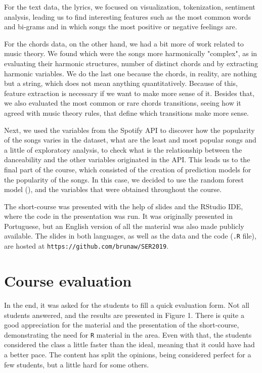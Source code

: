 For the text data, the lyrics, we focused on visualization,
tokenization, sentiment analysis, leading us to find interesting
features such as the most common words and bi-grams and in which songs the most positive or negative feelings are.  

For the chords data, on the other hand, we had a bit
more of work related to music theory. We found which
were the songs more harmonically "complex", as in evaluating
their harmonic structures, number of distinct chords and
by extracting harmonic variables. We do the last one 
because the chords, in reality, are nothing but a string, 
which does not mean anything quantitatively. Because of 
this, feature extraction is necessary if we want to make
more sense of it. Besides that, we also evaluated the
most common or rare chords transitions, seeing how it agreed
with music theory rules, that define which transitions 
make more sense. 

Next, we used the variables from the Spotify API 
to discover how the popularity of the songs varies in the
dataset, what are the least and most popular songs and
a little of exploratory analysis, to check what is the relationship between the danceability and the other variables originated in the API. This leads us to the final
part of the course, which consisted of the creation
of prediction models for the popularity of the songs. In 
this case, we decided to use the random forest model
(\cite{Breiman2001}), 
and the variables that were obtained throughout the course. 


The short-course was presented with the help of slides 
and the RStudio IDE, where the code in the presentation
was run. It was originally presented in Portuguese, 
but an English version of all the material was also made
publicly available. The slides in both languages, as
well as the data and the code (\texttt{.R} file),  are
hosted at \texttt{https://github.com/brunaw/SER2019}.


\section{Course evaluation}

In the end, it was asked for the students to fill
a quick evaluation form. Not all students answered, 
and the results are presented in Figure 1. 
There is quite a good appreciation for the material and 
the presentation of the short-course, demonstrating the
need for \texttt{R} material in the area. 
Even with that, the students considered the class a little faster than the ideal, meaning that it could 
have had a better pace. The content has split the opinions, 
being considered perfect for a few students, but a little
hard for some others. 


